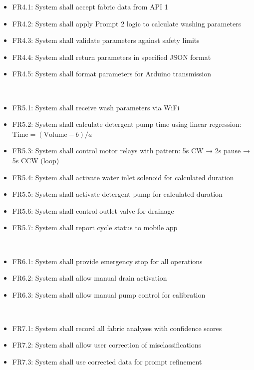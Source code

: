 \begin{description}
        \begin{itemize}
            \item FR4.1: System shall accept fabric data from API 1
            \item FR4.2: System shall apply Prompt 2 logic to calculate washing parameters
            \item FR4.3: System shall validate parameters against safety limits
            \item FR4.4: System shall return parameters in specified JSON format
            \item FR4.5: System shall format parameters for Arduino transmission
        \end{itemize}
    \item[FR5: Arduino Control] \hfill \\
        \begin{itemize}
            \item FR5.1: System shall receive wash parameters via WiFi
            \item FR5.2: System shall calculate detergent pump time using linear regression: \( \text{Time} = (\text{Volume} - b) / a \)
            \item FR5.3: System shall control motor relays with pattern: 5s CW → 2s pause → 5s CCW (loop)
            \item FR5.4: System shall activate water inlet solenoid for calculated duration
            \item FR5.5: System shall activate detergent pump for calculated duration
            \item FR5.6: System shall control outlet valve for drainage
            \item FR5.7: System shall report cycle status to mobile app
        \end{itemize}
    \item[FR6: Manual Override] \hfill \\
        \begin{itemize}
            \item FR6.1: System shall provide emergency stop for all operations
            \item FR6.2: System shall allow manual drain activation
            \item FR6.3: System shall allow manual pump control for calibration
        \end{itemize}
    \item[FR7: Feedback and Logging] \hfill \\
        \begin{itemize}
            \item FR7.1: System shall record all fabric analyses with confidence scores
            \item FR7.2: System shall allow user correction of misclassifications
            \item FR7.3: System shall use corrected data for prompt refinement
        \end{itemize}
\end{description}

